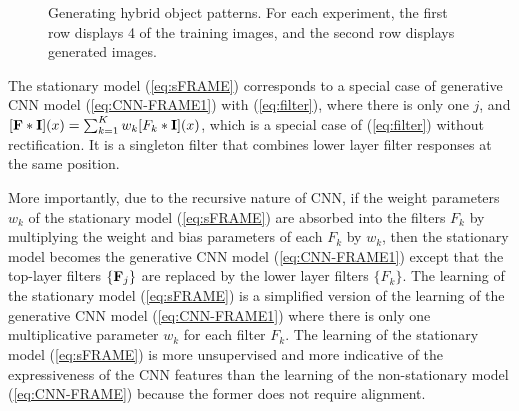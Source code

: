 \documentclass[letterpaper]{article}
\def\I{{\bf I}}
\def\F{{\bf F}}
\begin{document}
\begin{figure}
	\centering
	\setlength{\fboxrule}{1pt}
	\setlength{\fboxsep}{0cm}
	
	\caption{Generating hybrid object patterns.  For each experiment, 
		the first row displays 4 of the training images, and the second row displays generated images.  }
	\label{fig:hybrid1}
\end{figure}




The stationary model (\ref{eq:sFRAME}) corresponds to a special case of  generative CNN model (\ref{eq:CNN-FRAME1}) with (\ref{eq:filter}), where there is only one $j$, and $[\F*\I](x) = \sum_{k=1}^{K} w_k [F_k*\I](x)$, which is a special case of (\ref{eq:filter}) without rectification. It is a singleton filter that combines lower layer filter responses at the same position. 

More importantly, due to the recursive nature of CNN, if the weight parameters $w_k$ of the stationary model  (\ref{eq:sFRAME}) are absorbed into the filters $F_k$ by multiplying the weight and bias parameters of each $F_k$ by $w_k$,  then the stationary model becomes the generative CNN model (\ref{eq:CNN-FRAME1}) except that the top-layer filters $\{\F_j\}$ are replaced by the lower layer filters $\{F_k\}$.  The  learning of  the stationary model  (\ref{eq:sFRAME}) is a simplified version of the learning of the generative CNN model  (\ref{eq:CNN-FRAME1})  where there is only one multiplicative parameter $w_k$  for each filter $F_k$. The learning of  the stationary model  (\ref{eq:sFRAME}) is more unsupervised and more indicative of the expressiveness of the CNN features than the learning of the non-stationary model (\ref{eq:CNN-FRAME}) because the former does not require alignment. 
\end{document}
